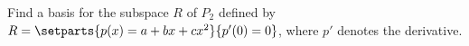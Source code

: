 Find a basis for the subspace $R$ of $P_2$ defined by $R = \setparts{p(x) = a + bx + cx^2}{p'(0) = 0}$, where $p'$ denotes the derivative.